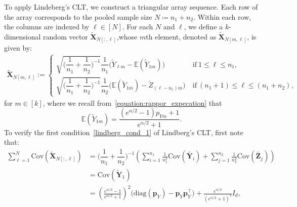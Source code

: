 \documentclass[twoside,11pt]{article}
\newcommand{\rvTwo}{Y}
\newcommand{\rvThree}{Z}
\newcommand{\vectorize}[1]{\mathbf{#1}}
\newcommand{\rvX}{X} %
\newcommand{\rVecX}{\vectorize{\rvX}}
\newcommand{\rvY}{Y}
\newcommand{\rVecY}{\vectorize{\rvY}}
\newcommand{\rvZ}{Z}
\newcommand{\rVecZ}{\vectorize{\rvZ}}
\newcommand{\mE}{\mathbb{E}} %
\newcommand{\alphabetSize}{k} %
\newcommand{\vectorIndex}{m}
\newcommand{\sampleSize}{n}
\newcommand{\probVecElement}[2]{p_{{#1}{#2}}}
\newcommand{\probVec}{\mathbf{p}} %
\newcommand{\privacyParameter}{\alpha} %
\begin{document}
\begin{appendix}
	To apply Lindeberg's CLT, we construct a triangular array sequence. Each row of the array corresponds to the pooled sample size $N \coloneqq \sampleSize_1 + \sampleSize_2$. Within each row, the columns are indexed by $\ell \in [N]$. For each $N$ and $\ell$, we define a $\alphabetSize$-dimensional random vector $\tilde{\rVecX}_{N[:,\ell]}$,whose $\vectorIndex$th element, denoted as $\tilde{\rVecX}_{N[\vectorIndex,\ell]}$, is given by: 
	\begin{align*}
		\tilde{\rVecX}_{N[\vectorIndex,\ell]} :=
		\begin{cases}
			\sqrt{\biggl( \dfrac{1}{\sampleSize_1}+\dfrac{1}{\sampleSize_2} \biggr)^{-1}}
			\dfrac{1}{\sampleSize_1}
			\bigl(
			\tilde{\rvTwo}_{\ell \vectorIndex}
			-
			\mE(\tilde{\rvTwo}_{1\vectorIndex})
			\bigr)
			~&\text{if}~
			1 \leq \ell \leq \sampleSize_1,
			\\
			\sqrt{\biggl( \dfrac{1}{\sampleSize_1}+\dfrac{1}{\sampleSize_2} \biggr)^{-1}}
			\dfrac{1}{\sampleSize_2}
			\bigl(
			\mE(\tilde{\rvTwo}_{1\vectorIndex})
			-
			\tilde{\rvThree}_{(\ell-\sampleSize_1)\vectorIndex}
			\bigr)
			~&\text{if}~
			(\sampleSize_1 + 1) \leq \ell \leq ( \sampleSize_1 + \sampleSize_2),
		\end{cases}
	\end{align*}
	for $\vectorIndex \in [\alphabetSize]$,
	where we recall from~\eqref{equation:rappor_expecation} that
	\begin{equation}
		\mE(\tilde{\rvTwo}_{1\vectorIndex})
		=
		\frac{
			(e^{\privacyParameter/2}-1)
			\probVecElement{\rvTwo}{\vectorIndex} + 1
		}{
			e^{\privacyParameter/2}+1
		}.
	\end{equation}
	To verify  the first condition~\eqref{lindberg_cond_1} of Lindberg's CLT, first note that:
	\begin{align*}
		\sum_{\ell=1}^N \mathrm{Cov}(\tilde{\rVecX}_{N[:,\ell]})
		&=
		\biggl( \dfrac{1}{\sampleSize_1}+\dfrac{1}{\sampleSize_2} \biggr)^{-1}
		\left(	\sum_{i=1}^{\sampleSize_1}
		\frac{1}{\sampleSize_1^2}
		\mathrm{Cov}(\tilde{\rVecY_i})
		+
		\sum_{j=1}^{\sampleSize_2}
		\frac{1}{\sampleSize_2^2}
		\mathrm{Cov}(\tilde{\rVecZ_j})
		\right)
		\\&=
		\mathrm{Cov}(\tilde{\rVecY}_1)
		\\&=
		\left(\frac{e^{\privacyParameter/2}-1}{e^{\privacyParameter/2}+1}
		\right)^2
		\bigl(
		\mathrm{diag}(\probVec_{\rvTwo}) - \probVec_{\rvTwo} {\probVec^\top_{\rvY}}
		\bigr)
		+
		\frac{e^{\privacyParameter/2}}{(e^{\privacyParameter/2}+1)^2}
		I_d,
	\end{align*}

\end{appendix}
\end{document}
